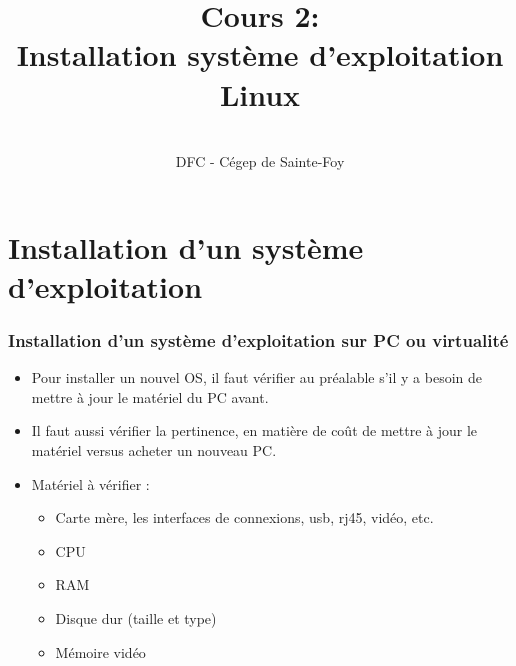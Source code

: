  




\newcommand{\Nocours}{2}






	
	
	\title[Les OS et Linux]{
		Cours \Nocours :\\ Installation système d'exploitation Linux}
	\author[\initiales]{\prof \\ DFC - Cégep de Sainte-Foy}
	
	\date{\null}
	
	
	
	
	
	\begin{frame}
		\titlepage
	\end{frame}
	
	\begin{frame}
		
		\tableofcontents
		
	\end{frame}
	
	\section{Installation d’un système d’exploitation}
	\begin{frame}[containsverbatim]
		\frametitle{Installation d’un système d’exploitation sur PC ou virtualité}
		\begin{itemize}
			\item  Pour installer un nouvel OS, il faut vérifier au préalable
			s'il y a besoin de mettre à jour le matériel du PC avant.
			\item Il faut aussi vérifier la pertinence, en matière de coût de
			mettre à jour le matériel versus acheter un nouveau PC.
			\item Matériel à vérifier :
			\begin{itemize}
				\item Carte mère, les interfaces de connexions, usb, rj45, vidéo, etc.
				\item CPU
				\item RAM
				\item Disque dur (taille et type) 
				\item Mémoire vidéo
			\end{itemize}
		\end{itemize}
	\end{frame}
	
